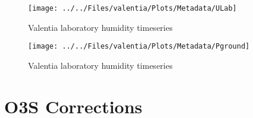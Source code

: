 \documentclass{article}
\begin{document}
               \begin{figure}
        \centering
\texttt{[image: ../../Files/valentia/Plots/Metadata/ULab]}
    \caption{Valentia laboratory humidity timeseries}
            \label{fig:ULab}
    \end{figure}

               \begin{figure}
        \centering
\texttt{[image: ../../Files/valentia/Plots/Metadata/Pground]}
    \caption{Valentia laboratory humidity timeseries}
            \label{fig:PLab}
    \end{figure}

\section{O3S Corrections}
\label{sec:v04}
\end{document}
